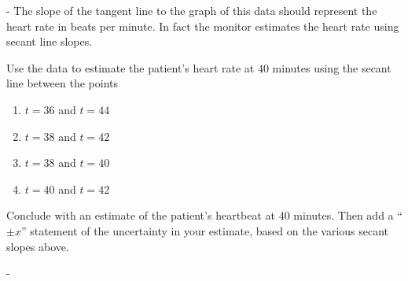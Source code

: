 \documentclass[12pt]{article}
\makeatletter
\newcounter{probcount}
\newcounter{subprobcount}
\newlength\probsep
\newlength\pshrinking
\newif\iffirstprob
\newenvironment{aproblems}%
  {\ifhmode\unskip\par\fi\setcounter{probcount}{0}\probsep\parskip
  \sbox\@tempboxa{\textbf{9.}}\pshrinking\wd\@tempboxa\advance\pshrinking\labelsep
  \let\hproblem\aproblem
  \advance\linewidth -\pshrinking
  \advance\@totalleftmargin\pshrinking
  \advance\leftskip\pshrinking}%
  {\ifhmode\unskip \par\fi\advance\leftskip-\pshrinking}%
\newcommand{\aproblem}{%
  \setcounter{subprobcount}{0}%
  \stepcounter{probcount}%
  \def\@currentlabel{\arabic{probcount}}%
  \ifhmode
    \unskip \par
  \fi
  \iffirstprob\else\addvspace\probsep\fi
  \firstprobfalse
  \hskip -\labelwidth\hskip -\labelsep 
  \hbox to\labelwidth{\hss\textbf{\arabic{probcount}.}}\hskip\labelsep
}%
\makeatother
\begin{document}
\begin{aproblems}
The slope of the tangent line to the graph of this data should represent the heart rate in beats per minute.  In fact the monitor estimates the heart rate using secant line slopes.

Use the data to estimate the patient's heart rate at $40$ minutes using the secant line between the points
\renewcommand{\labelenumi}{\alph{enumi})}
\begin{enumerate}
\item $t=36$ and $t=44$
\item $t=38$ and $t=42$
\item $t=38$ and $t=40$
\item $t=40$ and $t=42$
\end{enumerate}
Conclude with an estimate of the patient's heartbeat at 40 minutes.  Then add a ``$\pm x$'' statement of the uncertainty in your estimate, based on the various secant slopes above.
\vfill


\end{aproblems}
\end{document}
